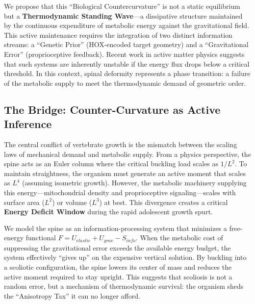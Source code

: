 \documentclass[11pt]{article}
\begin{document}
We propose that this ``Biological Countercurvature'' is not a static equilibrium but a \textbf{Thermodynamic Standing Wave}—a dissipative structure maintained by the continuous expenditure of metabolic energy against the gravitational field\cite{prigogine1977self}. This active maintenance requires the integration of two distinct information streams: a ``Genetic Prior'' (HOX-encoded target geometry) and a ``Gravitational Error'' (proprioceptive feedback). Recent work in active matter physics suggests that such systems are inherently unstable if the energy flux drops below a critical threshold\cite{marchetti2013hydrodynamics, du2023active}. In this context, spinal deformity represents a phase transition: a failure of the metabolic supply to meet the thermodynamic demand of geometric order.

\subsection*{The Bridge: Counter-Curvature as Active Inference}
The central conflict of vertebrate growth is the mismatch between the scaling laws of mechanical demand and metabolic supply. From a physics perspective, the spine acts as an Euler column where the critical buckling load scales as $1/L^2$. To maintain straightness, the organism must generate an active moment that scales as $L^4$ (assuming isometric growth). However, the metabolic machinery supplying this energy—mitochondrial density and proprioceptive signaling—scales with surface area ($L^2$) or volume ($L^3$) at best\cite{west1997general, pontzer2016constrained}. This divergence creates a critical \textbf{Energy Deficit Window} during the rapid adolescent growth spurt.

We model the spine as an information-processing system that minimizes a free-energy functional $F = U_{elastic} + U_{grav} - S_{info}$\cite{friston2010free}. When the metabolic cost of suppressing the gravitational error exceeds the available energy budget, the system effectively ``gives up'' on the expensive vertical solution. By buckling into a scoliotic configuration, the spine lowers its center of mass and reduces the active moment required to stay upright. This suggests that scoliosis is not a random error, but a mechanism of thermodynamic survival: the organism sheds the ``Anisotropy Tax'' it can no longer afford\cite{abramov2020biomechanics, levin2019computational}.
\end{document}
